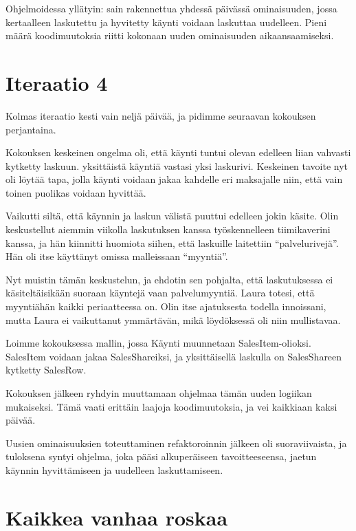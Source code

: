 Ohjelmoidessa yllätyin: sain rakennettua yhdessä päivässä ominaisuuden,
jossa kertaalleen laskutettu ja hyvitetty käynti voidaan laskuttaa
uudelleen. Pieni määrä koodimuutoksia riitti kokonaan uuden ominaisuuden
aikaansaamiseksi.

\hypertarget{iteraatio-4}{%
\section{Iteraatio 4}\label{iteraatio-4}}

Kolmas iteraatio kesti vain neljä päivää, ja pidimme seuraavan kokouksen
perjantaina.

Kokouksen keskeinen ongelma oli, että käynti tuntui olevan edelleen
liian vahvasti kytketty laskuun. yksittäistä käyntiä vastasi yksi
laskurivi. Keskeinen tavoite nyt oli löytää tapa, jolla käynti voidaan
jakaa kahdelle eri maksajalle niin, että vain toinen puolikas voidaan
hyvittää.

Vaikutti siltä, että käynnin ja laskun välistä puuttui edelleen jokin
käsite. Olin keskustellut aiemmin viikolla laskutuksen kanssa
työskennelleen tiimikaverini kanssa, ja hän kiinnitti huomiota siihen,
että laskuille laitettiin ``palvelurivejä''. Hän oli itse käyttänyt
omissa malleissaan ``myyntiä''.

Nyt muistin tämän keskustelun, ja ehdotin sen pohjalta, että
laskutuksessa ei käsiteltäisikään suoraan käyntejä vaan palvelumyyntiä.
Laura totesi, että myyntiähän kaikki periaatteessa on. Olin itse
ajatuksesta todella innoissani, mutta Laura ei vaikuttanut ymmärtävän,
mikä löydöksessä oli niin mullistavaa.

Loimme kokouksessa mallin, jossa Käynti muunnetaan SalesItem-olioksi.
SalesItem voidaan jakaa SalesShareiksi, ja yksittäisellä laskulla on
SalesShareen kytketty SalesRow.

Kokouksen jälkeen ryhdyin muuttamaan ohjelmaa tämän uuden logiikan
mukaiseksi. Tämä vaati erittäin laajoja koodimuutoksia, ja vei kaikkiaan
kaksi päivää.

Uusien ominaisuuksien toteuttaminen refaktoroinnin jälkeen oli
suoraviivaista, ja tuloksena syntyi ohjelma, joka pääsi alkuperäiseen
tavoitteeseensa, jaetun käynnin hyvittämiseen ja uudelleen
laskuttamiseen.

\hypertarget{kaikkea-vanhaa-roskaa}{%
\section{Kaikkea vanhaa roskaa}\label{kaikkea-vanhaa-roskaa}}

